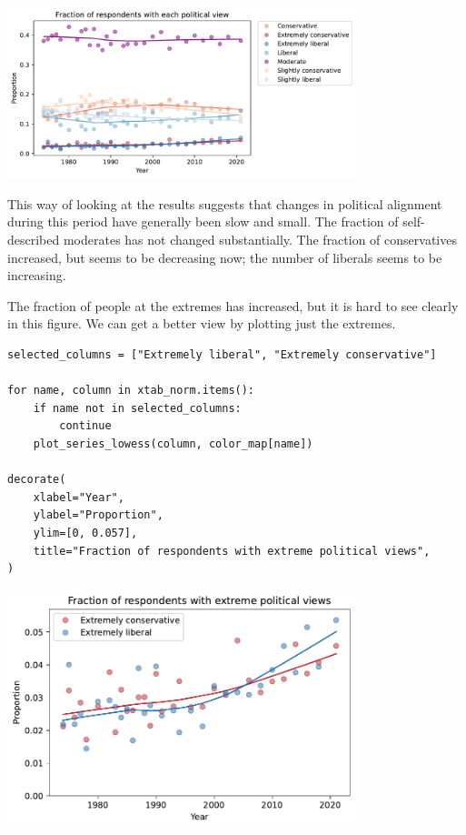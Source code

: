 \begin{center}
\includegraphics[width=4in]{chapters/02_polviews_soln_files/02_polviews_soln_88_0.pdf}
\end{center}

This way of looking at the results suggests that changes in political
alignment during this period have generally been slow and small. The
fraction of self-described moderates has not changed substantially. The
fraction of conservatives increased, but seems to be decreasing now; the
number of liberals seems to be increasing.

The fraction of people at the extremes has increased, but it is hard to
see clearly in this figure. We can get a better view by plotting just
the extremes.

\begin{lstlisting}[]
selected_columns = ["Extremely liberal", "Extremely conservative"]

for name, column in xtab_norm.items():
    if name not in selected_columns:
        continue
    plot_series_lowess(column, color_map[name])

decorate(
    xlabel="Year",
    ylabel="Proportion",
    ylim=[0, 0.057],
    title="Fraction of respondents with extreme political views",
)
\end{lstlisting}

\begin{center}
\includegraphics[width=4in]{chapters/02_polviews_soln_files/02_polviews_soln_90_0.pdf}
\end{center}

